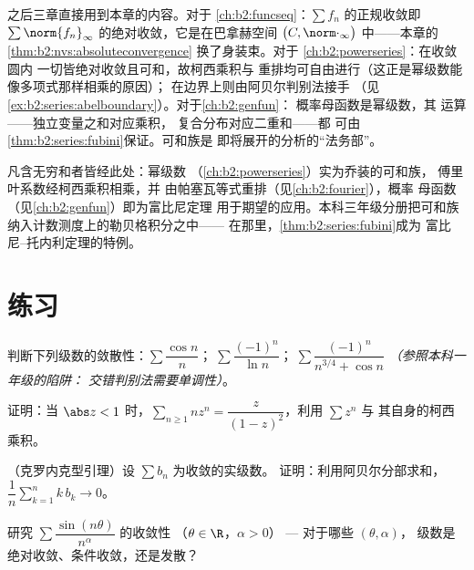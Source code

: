 \begin{remark}[本卷内的展望]\label{rem:b2:series:perspectives}
之后三章直接用到本章的内容。对于
\cref{ch:b2:funcseq}：$\sum f_n$ 的正规收敛即
$\sum\norm{f_n}_\infty$ 的绝对收敛，它是在巴拿赫空间
$\bigl(C, \norm\cdot_\infty\bigr)$ 中——本章的
\cref{thm:b2:nvs:absoluteconvergence} 换了身装束。对于
\cref{ch:b2:powerseries}：在收敛圆内
一切皆绝对收敛且可和，故柯西乘积与
重排均可自由进行（这正是幂级数能像多项式那样相乘的原因）；
在边界上则由阿贝尔判别法接手
（见\cref{ex:b2:series:abelboundary}）。对于\cref{ch:b2:genfun}：
概率母函数是幂级数，其
运算——独立变量之和对应乘积，
复合分布对应二重和——都
可由\cref{thm:b2:series:fubini}保证。可和族是
即将展开的分析的“法务部”。
\end{remark}

\begin{remark}[本章的应用]
凡含无穷和者皆经此处：幂级数
（\cref{ch:b2:powerseries}）实为乔装的可和族，
傅里叶系数经柯西乘积相乘，并
由帕塞瓦等式重排（见\cref{ch:b2:fourier}），概率
母函数（见\cref{ch:b2:genfun}）即为富比尼定理
用于期望的应用。本科三年级分册把可和族
纳入计数测度上的勒贝格积分之中——
在那里，\cref{thm:b2:series:fubini}成为
富比尼–托内利定理的特例。
\end{remark}

\section{练习}

\begin{exercise}[$\star$]\label{exo:b2:series:1}
判断下列级数的敛散性：$\sum \dfrac{\cos n}{n}$；$\;\sum \dfrac{(-1)^n}{\ln
n}$；$\;\sum \dfrac{(-1)^n}{n^{3/4} + \cos n}$ \emph{（参照本科一年级的陷阱：
交错判别法需要单调性）}。
\end{exercise}

\begin{exercise}[$\star$]\label{exo:b2:series:2}
证明：当 $\abs z < 1$ 时，$\sum_{n\geq1} n z^{n} =
\dfrac{z}{(1-z)^2}$，利用 $\sum z^n$ 与
其自身的柯西乘积。
\end{exercise}

\begin{exercise}[$\star\star$]\label{exo:b2:series:3}
（克罗内克型引理）设 $\sum b_n$ 为收敛的实级数。
证明：利用阿贝尔分部求和，$\dfrac{1}{n}\sum_{k=1}^{n} k\,b_k
\to 0$。
\end{exercise}

\begin{exercise}[$\star\star$]\label{exo:b2:series:4}
研究 $\sum \dfrac{\sin(n\theta)}{n^\alpha}$ 的收敛性
（$\theta \in \R$，$\alpha > 0$） --- 对于哪些 $(\theta, \alpha)$，
级数是绝对收敛、条件收敛，还是发散？
\end{exercise}


